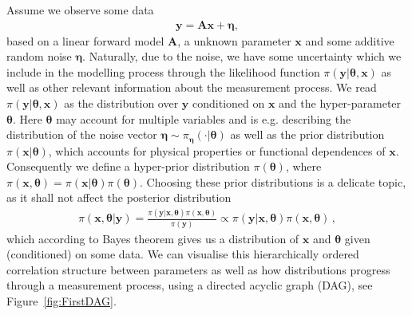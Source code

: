 Assume we observe some data
\begin{align}
	\bm{y} = \bm{A} \bm{x} + \bm{\eta},
	\label{eq:LinDat}
\end{align}
based on a linear forward model $\bm{A}$, a unknown parameter $\bm{x}$ and some additive random noise $\bm{\eta}$.
Naturally, due to the noise, we have some uncertainty which we include in the modelling process through the likelihood function $\pi(\bm{y}|\bm{\theta},\bm{x})$ as well as other relevant information about the measurement process.
We read $\pi(\bm{y}|\bm{\theta},\bm{x})$ as the distribution over $\bm{y}$ conditioned on $\bm{x}$ and the hyper-parameter $\bm{\theta}$.
Here $\bm{\theta}$ may account for multiple variables and is e.g. describing the distribution of the noise vector $\bm{\eta} \sim \pi_{\bm{\eta}}(\cdot|\bm{\theta})$ as well as the prior distribution $\pi(\bm{x}|\bm{\theta})$, which accounts for physical properties or functional dependences of $\bm{x}$.
Consequently we define a hyper-prior distribution $\pi(\bm{\theta})$, where $\pi(\bm{x}, \bm{\theta}) = \pi(\bm{x}|\bm{\theta}) \pi(\bm{\theta}) $.
Choosing these prior distributions is a delicate topic, as it shall not affect the posterior distribution 
\begin{align}
	\pi(\bm{x},\bm{\theta}|\bm{y}) = \frac{ \pi(\bm{y} | \bm{x}, \bm{\theta} ) \pi(\bm{x}, \bm{\theta})}{\pi(\bm{y})} \propto \pi(\bm{y} | \bm{x}, \bm{\theta} ) \pi(\bm{x}, \bm{\theta}) \, ,
\end{align}
which according to Bayes theorem gives us a distribution of $\bm{x}$ and $\bm{\theta}$ given (conditioned) on some data.
We can visualise this hierarchically ordered correlation structure between parameters as well as how distributions progress through a measurement process, using a directed acyclic graph (DAG), see Figure~\ref{fig:FirstDAG}.

